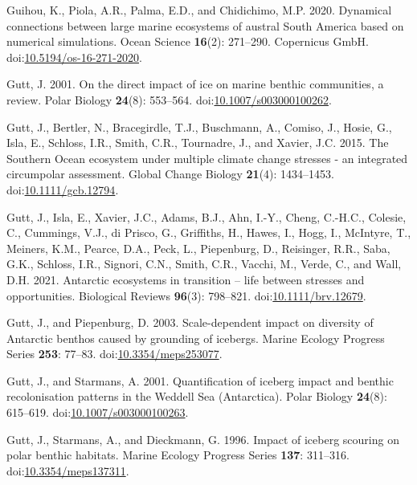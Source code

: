 \documentclass[
]{article}
\newlength{\cslhangindent}
\newenvironment{CSLReferences}[2] %
 {\begin{list}{}{%
  \setlength{\itemindent}{0pt}
  \setlength{\leftmargin}{0pt}
  \setlength{\parsep}{0pt}
  \ifodd #1
   \setlength{\leftmargin}{\cslhangindent}
   \setlength{\itemindent}{-1\cslhangindent}
  \fi
  \setlength{\itemsep}{#2\baselineskip}}}
 {\end{list}}
\begin{document}
\begin{CSLReferences}{1}{0}
Guihou, K., Piola, A.R., Palma, E.D., and Chidichimo, M.P. 2020.
Dynamical connections between large marine ecosystems of austral {South
America} based on numerical simulations. Ocean Science \textbf{16}(2):
271--290. Copernicus GmbH.
doi:\href{https://doi.org/10.5194/os-16-271-2020}{10.5194/os-16-271-2020}.

Gutt, J. 2001. On the direct impact of ice on marine benthic
communities, a review. Polar Biology \textbf{24}(8): 553--564.
doi:\href{https://doi.org/10.1007/s003000100262}{10.1007/s003000100262}.

Gutt, J., Bertler, N., Bracegirdle, T.J., Buschmann, A., Comiso, J.,
Hosie, G., Isla, E., Schloss, I.R., Smith, C.R., Tournadre, J., and
Xavier, J.C. 2015. The {Southern Ocean} ecosystem under multiple climate
change stresses - an integrated circumpolar assessment. Global Change
Biology \textbf{21}(4): 1434--1453.
doi:\href{https://doi.org/10.1111/gcb.12794}{10.1111/gcb.12794}.

Gutt, J., Isla, E., Xavier, J.C., Adams, B.J., Ahn, I.-Y., Cheng,
C.-H.C., Colesie, C., Cummings, V.J., di Prisco, G., Griffiths, H.,
Hawes, I., Hogg, I., McIntyre, T., Meiners, K.M., Pearce, D.A., Peck,
L., Piepenburg, D., Reisinger, R.R., Saba, G.K., Schloss, I.R., Signori,
C.N., Smith, C.R., Vacchi, M., Verde, C., and Wall, D.H. 2021. Antarctic
ecosystems in transition -- life between stresses and opportunities.
Biological Reviews \textbf{96}(3): 798--821.
doi:\href{https://doi.org/10.1111/brv.12679}{10.1111/brv.12679}.

Gutt, J., and Piepenburg, D. 2003. Scale-dependent impact on diversity
of {Antarctic} benthos caused by grounding of icebergs. Marine Ecology
Progress Series \textbf{253}: 77--83.
doi:\href{https://doi.org/10.3354/meps253077}{10.3354/meps253077}.

Gutt, J., and Starmans, A. 2001. Quantification of iceberg impact and
benthic recolonisation patterns in the {Weddell Sea} ({Antarctica}).
Polar Biology \textbf{24}(8): 615--619.
doi:\href{https://doi.org/10.1007/s003000100263}{10.1007/s003000100263}.

Gutt, J., Starmans, A., and Dieckmann, G. 1996. Impact of iceberg
scouring on polar benthic habitats. Marine Ecology Progress Series
\textbf{137}: 311--316.
doi:\href{https://doi.org/10.3354/meps137311}{10.3354/meps137311}.


\end{CSLReferences}
\end{document}
